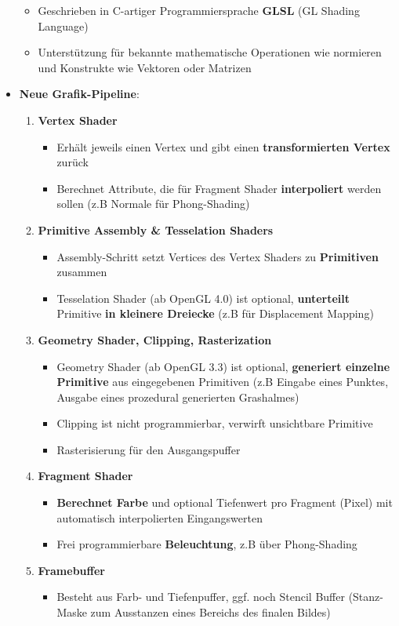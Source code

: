 \begin{itemize}
\begin{itemize}
		\item Geschrieben in C-artiger Programmiersprache \textbf{GLSL} (GL Shading Language)
		\item Unterstützung für bekannte mathematische Operationen wie normieren und Konstrukte wie Vektoren oder Matrizen
	\end{itemize}
	\newpage
	\item \textbf{Neue Grafik-Pipeline}:
	\begin{enumerate}
		\item \textbf{Vertex Shader}
		\begin{itemize}
			\item Erhält jeweils einen Vertex und gibt einen \textbf{transformierten Vertex} zurück
			\item Berechnet Attribute, die für Fragment Shader \textbf{interpoliert} werden sollen (z.B Normale für Phong-Shading)
		\end{itemize}
		\item \textbf{Primitive Assembly \& Tesselation Shaders}
		\begin{itemize}
			\item Assembly-Schritt setzt Vertices des Vertex Shaders zu \textbf{Primitiven} zusammen
			\item Tesselation Shader (ab OpenGL 4.0) ist optional, \textbf{unterteilt} Primitive \textbf{in kleinere Dreiecke} (z.B für Displacement Mapping)
		\end{itemize}
		\item \textbf{Geometry Shader, Clipping, Rasterization}
		\begin{itemize}
			\item Geometry Shader (ab OpenGL 3.3) ist optional, \textbf{generiert einzelne Primitive} aus eingegebenen Primitiven (z.B Eingabe eines Punktes, Ausgabe eines prozedural generierten Grashalmes)
			\item Clipping ist nicht programmierbar, verwirft unsichtbare Primitive
			\item Rasterisierung für den Ausgangspuffer
		\end{itemize}
		\item \textbf{Fragment Shader}
		\begin{itemize}
			\item \textbf{Berechnet Farbe} und optional Tiefenwert pro Fragment (Pixel) mit automatisch interpolierten Eingangswerten
			\item Frei programmierbare \textbf{Beleuchtung}, z.B über Phong-Shading
		\end{itemize}
		\item \textbf{Framebuffer}
		\begin{itemize}
			\item Besteht aus Farb- und Tiefenpuffer, ggf. noch Stencil Buffer (Stanz-Maske zum Ausstanzen eines Bereichs des finalen Bildes)
		\end{itemize}
	\end{enumerate}
    \end{itemize}